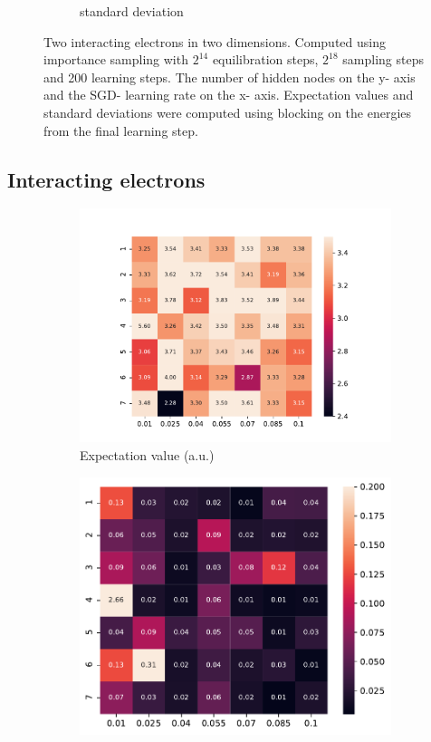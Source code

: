 \documentclass[11pt,a4paper,titlepage]{article}
\begin{document}
\begin{figure}[H]
\begin{subfigure}{.5\textwidth}
\caption{standard deviation}\label{J2}
\end{subfigure}
\caption[as]{Two interacting electrons in two dimensions. Computed using importance sampling with $2^{14}$ equilibration steps, $2^{18}$ sampling steps and 200 learning steps. The number of hidden nodes on the y- axis and the SGD- learning rate on the x- axis. Expectation values and standard deviations were computed using blocking on the energies from the final learning step.}
\label{fig:interacting_sweep}
\end{figure}
\subsection{Interacting electrons}
\begin{figure}[H]
\begin{subfigure}{.5\textwidth}
\includegraphics[trim=2cm 0.9cm 2cm 0.9cm,scale = 0.6]{exp_val.pdf}
\caption{Expectation value (a.u.)}\label{J1}
\end{subfigure}%
\begin{subfigure}{.5\textwidth}
\includegraphics[trim=0cm 0.3cm 0cm 0.0cm,scale = 0.6]{std_dev.pdf}

\end{subfigure}
\end{figure}
\end{document}
